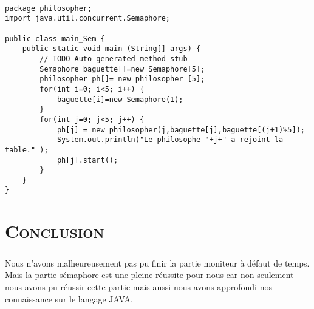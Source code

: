 	\begin{lstlisting}
		
package philosopher;
import java.util.concurrent.Semaphore;

public class main_Sem { 
	public static void main (String[] args) {
		// TODO Auto-generated method stub
		Semaphore baguette[]=new Semaphore[5];
		philosopher ph[]= new philosopher [5];
		for(int i=0; i<5; i++) {
			baguette[i]=new Semaphore(1);
		}
		for(int j=0; j<5; j++) {
			ph[j] = new philosopher(j,baguette[j],baguette[(j+1)%5]);
			System.out.println("Le philosophe "+j+" a rejoint la table." );
			ph[j].start();
		}
	}
}

	\end{lstlisting}



%
%
%
%


\chapter*{\textsc{Conclusion}}

	\paragraph{} Nous n'avons malheureusement pas pu finir la partie moniteur à défaut de temps. Mais la partie sémaphore est une pleine réussite pour nous car non seulement nous avons pu réussir cette partie mais aussi nous avons approfondi nos connaissance sur le langage JAVA.\\  